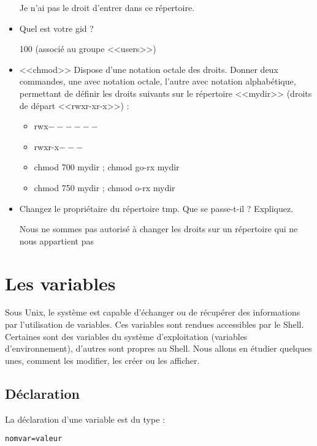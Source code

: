 \documentclass[11pt]{article}
\begin{document}
\begin{itemize}
\begin{solution}
Je n'ai pas le droit d'entrer dans ce répertoire.
\end{solution}
 \item Quel est votre gid ?
\begin{solution}
100 (associé au groupe <<users>>)
\end{solution}
 \item <<chmod>> Dispose d'une notation octale des droits. Donner deux commandes, une avec notation octale, l'autre avec notation alphabétique, permettant de définir les droits suivants sur le répertoire <<mydir>> (droits de départ <<rwxr-xr-x>>) :
 \begin{itemize}
  \item rwx$------$
  \item rwxr-x$---$
 \end{itemize}
\begin{solution}
 \begin{itemize}
  \item chmod 700 mydir ; chmod go-rx mydir
  \item chmod 750 mydir ; chmod o-rx mydir
 \end{itemize}
\end{solution}
 \item Changez le propriétaire du répertoire tmp. Que se passe-t-il ? Expliquez.
\begin{solution}
Nous ne sommes pas autorisé à changer les droits sur un répertoire qui ne nous appartient pas
\end{solution}
\end{itemize}

\section{Les variables}
Sous Unix, le système est capable d’échanger ou de récupérer des informations par l’utilisation de variables. Ces variables sont rendues accessibles par le Shell. Certaines sont des variables du système d’exploitation (variables d’environnement), d’autres sont propres au Shell.
Nous allons en étudier quelques unes, comment les modifier, les créer ou les afficher.

\subsection{Déclaration}

La déclaration d'une variable est du type :

\begin{lstlisting}
nomvar=valeur
\end{lstlisting}
\end{document}
